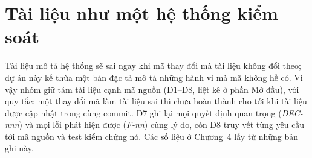 \documentclass[../main.tex]{subfiles}
\begin{document}
\section{Tài liệu như một hệ thống kiểm soát}
Tài liệu mô tả hệ thống sẽ sai ngay khi mã thay đổi mà tài liệu không đổi theo; dự án này kế thừa một
bản đặc tả mô tả những hành vi mà mã không hề có. Vì vậy nhóm giữ tám tài liệu cạnh mã nguồn (D1--D8,
liệt kê ở phần Mở đầu), với quy tắc: một thay đổi mã làm tài liệu sai thì chưa hoàn thành cho tới khi
tài liệu được cập nhật trong cùng commit. D7 ghi lại mọi quyết định quan trọng (\emph{DEC-nnn}) và
mọi lỗi phát hiện được (\emph{F-nn}) cùng lý do, còn D8 truy vết từng yêu cầu tới mã nguồn và test
kiểm chứng nó. Các số liệu ở Chương~4 lấy từ những bản ghi này.
\end{document}
